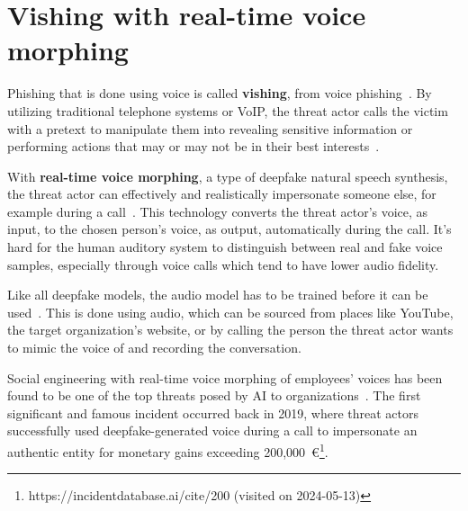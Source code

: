 \section{Vishing with real-time voice morphing}
\begin{comment}
\end{comment}

%
%
Phishing that is done using voice is called \textbf{vishing}, from voice phishing~\citep{doan_BTSE_Audio_Deepfake_Detection_2023}. By utilizing traditional telephone systems or VoIP, the threat actor calls the victim with a pretext to manipulate them into revealing sensitive information or performing actions that may or may not be in their best interests~\citep{hadnagy_Social_Engineering_The_Science_2018}.


%
%
With \textbf{real-time voice morphing}, a type of deepfake natural speech synthesis, the threat actor can effectively and realistically impersonate someone else, for example during a call~\citep{doan_BTSE_Audio_Deepfake_Detection_2023}. This technology converts the threat actor's voice, as input, to the chosen person's voice, as output, automatically during the call. It's hard for the human auditory system to distinguish between real and fake voice samples, especially through voice calls which tend to have lower audio fidelity.



%
%
Like all deepfake models, the audio model has to be trained before it can be used~\citep{doan_BTSE_Audio_Deepfake_Detection_2023}. This is done using audio, which can be sourced from places like YouTube, the target organization's website, or by calling the person the threat actor wants to mimic the voice of and recording the conversation.



%
%
Social engineering with real-time voice morphing of employees' voices has been found to be one of the top threats posed by AI to organizations~\citep{mirsky_Threat_Offensive_AI_Organizations_2023}. The first significant and famous incident occurred back in 2019, where threat actors successfully used deepfake-generated voice during a call to impersonate an authentic entity for monetary gains exceeding 200,000~€\footnote{https://incidentdatabase.ai/cite/200 (visited on 2024-05-13)}.
